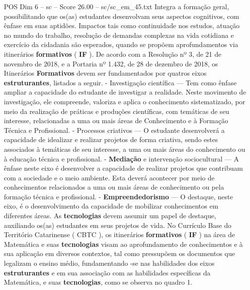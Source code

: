 \begin{textsample}{POS Dim 6 – sc – Score 26.00 – sc/sc\_em\_45.txt}
Integra a formação geral, possibilitando que os(as) estudantes desenvolvam seus aspectos cognitivos, com ênfase em suas aptidões.
Impactos tais como continuidade nos estudos, atuação no mundo do trabalho, resolução de demandas complexas na vida cotidiana e exercício da cidadania são esperados, quando se propõem aprofundamentos via itinerários \textbf{formativos} ( \textbf{IF} ).
De acordo com a Resolução nº 3, de 21 de novembro de 2018, e a Portaria nº 1.432, de 28 de dezembro de 2018, os Itinerários \textbf{Formativos} devem ser fundamentados por quatros eixos \textbf{estruturantes}, listados a seguir. - Investigação científica — Tem como ênfase ampliar a capacidade do estudante de investigar a realidade.
Neste movimento de investigação, ele compreende, valoriza e aplica o conhecimento sistematizado, por meio da realização de práticas e produções científicas, com temáticas de seu interesse, relacionadas a uma ou mais áreas de Conhecimento e à Formação Técnica e Profissional. - Processos criativos — O estudante desenvolverá a capacidade de idealizar e realizar projetos de forma criativa, sendo estes associados à temáticas de seu interesse, a uma ou mais áreas do conhecimento ou à educação técnica e profissional. - \textbf{Mediação} e intervenção sociocultural — A ênfase neste eixo é desenvolver a capacidade de realizar projetos que contribuam com a sociedade e o meio ambiente.
Esta deverá acontecer por meio de conhecimentos relacionados a uma ou mais áreas de conhecimento ou pela formação técnica e profissional. - \textbf{Empreendedorismo} — O destaque, neste eixo, é o desenvolvimento da capacidade de mobilizar conhecimentos em diferentes áreas.
As \textbf{tecnologias} devem assumir um papel de destaque, auxiliando os(as) estudantes em seus projetos de vida.
No Currículo Base do Território Catarinense ( CBTC ), os itinerários \textbf{formativos} ( \textbf{IF} ) na área de Matemática e suas \textbf{tecnologias} visam ao aprofundamento de conhecimentos e à sua aplicação em diversos contextos, tal como pressupõem os documentos que legalizam o ensino médio, fundamentando -se nas habilidades dos eixos \textbf{estruturantes} e em sua associação com as habilidades específicas da Matemática, e suas \textbf{tecnologias}, como se observa no quadro 1.

\end{textsample}
